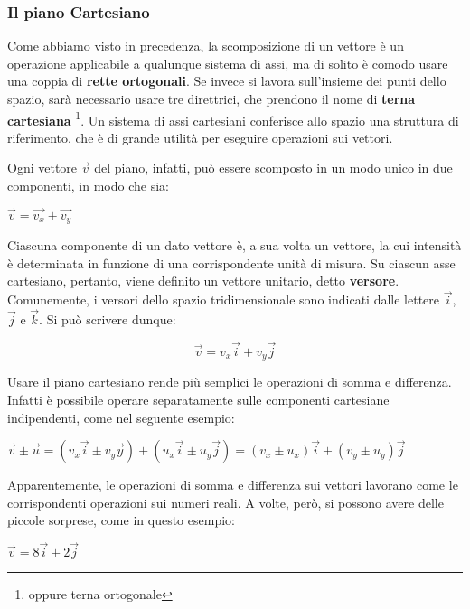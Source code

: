 \subsubsection*{Il piano Cartesiano}

Come abbiamo visto in precedenza, la scomposizione di un vettore è un operazione applicabile a qualunque sistema di assi, ma di solito è comodo usare una coppia di {\bfseries rette ortogonali}. Se invece si lavora sull'insieme dei punti dello spazio, sarà necessario usare tre direttrici, che prendono il nome di {\bfseries terna cartesiana} \footnote{oppure terna ortogonale}.\newline
Un sistema di assi cartesiani conferisce allo spazio una struttura di riferimento, che è di grande utilità per eseguire operazioni sui vettori.
 
Ogni vettore $ \vec{v}$ del piano, infatti, può essere scomposto in un modo unico in due componenti, in modo che sia:
\begin{center}
\begin{math}
\vec {v} = \vec{v_x} + \vec{v_y}
\end{math}
\end{center}
Ciascuna componente di un dato vettore è, a sua volta un vettore, la cui intensità è determinata in funzione di una corrispondente unità di misura.\newline
Su ciascun asse cartesiano, pertanto, viene definito un vettore unitario, detto {\bfseries versore}.
Comunemente, i versori dello spazio tridimensionale sono indicati dalle lettere
$\vec i$,$\vec j$ e ${\vec k}$. Si può scrivere dunque:
\begin{center}
\begin{equation}\label{eq:scomposizioneDiUnVettore}
\vec v = v_x \vec i + v_y \vec j
\end{equation}
\end{center}

Usare il piano cartesiano rende più semplici le operazioni di somma e differenza. Infatti è possibile operare separatamente sulle componenti cartesiane indipendenti, come nel seguente esempio:
\begin {center}
\begin{math}
\vec v \pm \vec u = (v_x \vec i \pm v_y \vec y) + (u_x \vec i \pm u_y \vec j) = (v_x \pm u_x) \vec i + (v_y \pm u_y) \vec j
\end{math}
\end{center}

Apparentemente, le operazioni di somma e differenza sui vettori lavorano come le corrispondenti operazioni sui numeri reali.\newline
A volte, però, si possono avere delle piccole sorprese, come in questo esempio:
\begin {center}
\begin {math}
\vec v = 8 \vec i + 2 \vec j
\end{math}
\end{center}

